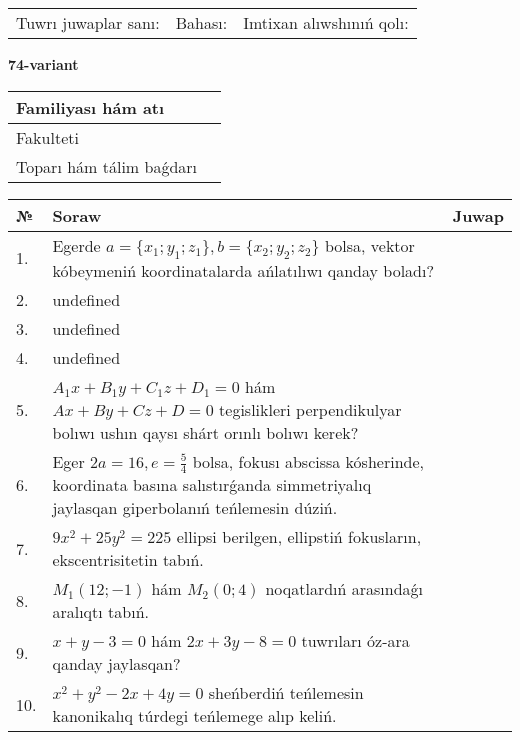\documentclass{article}
\begin{document}
\vspace{0.7cm}

\begin{tabular}{lll}
Tuwrı juwaplar sanı: \underline{\hspace{1cm}} & 
Bahası: \underline{\hspace{1cm}} & 
Imtixan alıwshınıń qolı: \underline{\hspace{2cm}} \\
\end{tabular}

\egroup

\newpage


\textbf{74-variant}\\

\bgroup
\def\arraystretch{1.6} %

\begin{tabular}{|m{5.7cm}|m{9.5cm}|}
\hline
Familiyası hám atı & \\
\hline
Fakulteti  & \\
\hline
Toparı hám tálim baǵdarı  & \\
\hline
\end{tabular}

\vspace{0.7cm}

\begin{tabular}{|m{0.7cm}|m{10cm}|m{4cm}|}
\hline
№ & Soraw & Juwap \\
\hline
1. & Egerde \(a = \{ x_{1}; y_{1}; z_{1}\}, b = \{ x_{2}; y_{2}; z_{2}\}\) bolsa, vektor kóbeymeniń koordinatalarda ańlatılıwı qanday boladı? &  \\
\hline
2. & undefined &  \\
\hline
3. & undefined &  \\
\hline
4. & undefined &  \\
\hline
5. & \(A_{1}x + B_{1}y + C_{1}z + D_{1} = 0\) hám \(Ax + By + Cz + D = 0\) tegislikleri perpendikulyar bolıwı ushın qaysı shárt orınlı bolıwı kerek? &  \\
\hline
6. & Eger \(2 a = 16, e = \frac{5}{4}\) bolsa, fokusı abscissa kósherinde, koordinata basına salıstırǵanda simmetriyalıq jaylasqan giperbolanıń teńlemesin dúziń. &  \\
\hline
7. & \(9 x^{2} + 25 y^{2} = 225\) ellipsi berilgen, ellipstiń fokusların, ekscentrisitetin tabıń. &  \\
\hline
8. & \(M_{1} (12; - 1)\) hám \(M_{2} (0;4)\) noqatlardıń arasındaǵı aralıqtı tabıń. &  \\
\hline
9. & \(x + y - 3 = 0\) hám \(2 x + 3 y - 8 = 0\) tuwrıları óz-ara qanday jaylasqan? &  \\
\hline
10. & \(x^{2} + y^{2} - 2 x + 4 y = 0\) sheńberdiń teńlemesin kanonikalıq túrdegi teńlemege alıp keliń. & \\
\hline
\end{tabular}
\end{document}
